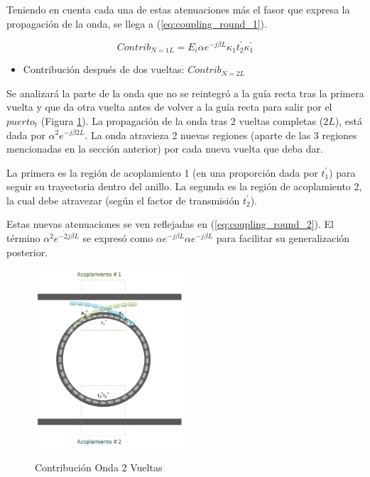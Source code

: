 Teniendo en cuenta cada una de estas atenuaciones más el fasor que expresa la propagación
de la onda, se llega a (\ref{eq:coupling_round_1}).

\begin{equation}
Contrib_{N=1L} = E_i \alpha e^{-j \beta L} \kappa_1 t_2^{'} \kappa_1^{'}
\label{eq:coupling_round_1}
\end{equation} 

\begin{itemize}
\item Contribución después de dos vueltas: $Contrib_{N=2L}$
\end{itemize} 

Se analizará la parte de la onda que no se reintegró a la guía recta tras la primera vuelta
y que da otra vuelta antes de volver a la guía recta para salir por el $puerto_t$
(Figura \ref{fig:rr_n2}).
La propagación de la onda tras 2 vueltas completas ($2L$), está dada por 
$\alpha^2 e^{-j \beta 2L}$.
La onda atravieza 2 nuevas regiones (aparte de las 3 regiones mencionadas en la sección anterior)
por cada nueva vuelta que deba dar. 

La primera es la región de acoplamiento 1 (en una proporción dada por $t_1^{'}$) 
para seguir su trayectoria dentro del anillo.
La segunda es la región de acoplamiento 2, la cual debe atravezar (según el factor de 
transmisión $t_2^{'}$).

Estas nuevas atenuaciones se ven reflejadas en (\ref{eq:coupling_round_2}). 
El término $\alpha^2 e^{-2j \beta L}$ se expresó como
 $\alpha e^{-j \beta L} \alpha e^{-j \beta L}$ para facilitar
su generalización posterior.

\begin{figure}[h!]
\caption{Contribución Onda 2 Vueltas}
\centering
\includegraphics[width=0.5\textwidth,natwidth=562,natheight=667]{figs/rr_n2.jpg}
\label{fig:rr_n2}
\end{figure} 


